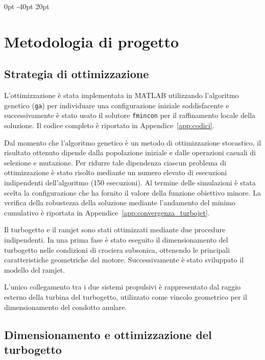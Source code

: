 \titlespacing*{\chapter}
{0pt}
{-40pt}
{20pt}


\label{ch:chapter_one}%
\newpage
\chapter{Metodologia di progetto}

\section{Strategia di ottimizzazione}

L’ottimizzazione è stata implementata in MATLAB utilizzando l’algoritmo genetico (\texttt{ga}) per individuare una configurazione iniziale soddisfacente e successivamente è stato usato il solutore \texttt{fmincon} per il raffinamento locale della soluzione. Il codice completo è riportato in Appendice~\ref{app:codici}.

Dal momento che l’algoritmo genetico è un metodo di ottimizzazione stocastico, il risultato ottenuto dipende dalla popolazione iniziale e dalle operazioni casuali di selezione e mutazione. Per ridurre tale dipendenza ciascun problema di ottimizzazione è stato risolto mediante un numero elevato di esecuzioni indipendenti dell’algoritmo (150 esecuzioni). Al termine delle simulazioni è stata scelta la configurazione che ha fornito il valore della funzione obiettivo minore. La verifica della robustezza della soluzione mediante l’andamento del minimo cumulativo è riportata in Appendice~\ref{app:convergenza_turbojet}.

Il turbogetto e il ramjet sono stati ottimizzati mediante due procedure indipendenti. In una prima fase è stato eseguito il dimensionamento del turbogetto nelle condizioni di crociera subsonica, ottenendo le principali caratteristiche geometriche del motore. Successivamente è stato sviluppato il modello del ramjet.

L'unico collegamento tra i due sistemi propulsivi è rappresentato dal raggio esterno della turbina del turbogetto, utilizzato come vincolo geometrico per il dimensionamento del condotto anulare. 


\section{Dimensionamento e ottimizzazione del turbogetto}
\label{sec:ottimizzazione_turbojet}


